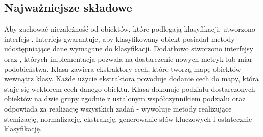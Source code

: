\documentclass{classrep}
\begin{document}
\subsection{Najważniejsze składowe}
Aby zachować niezależność od obiektów, które podlegają klasyfikacji, utworzono interfejs .
Interfejs gwarantuje, aby klasyfikowany obiekt posiadał metody udostępniające dane wymagane do klasyfikacji. Dodatkowo 
stworzono interfejsy  oraz , których implementacja pozwala na dostarczenie
nowych metryk lub miar podobieństwa. Klasa  zawiera ekstraktory cech, które tworzą mapę obiektów 
 wewnątrz klasy. Każde użycie ekstraktora powoduje dodanie cech do mapy, która staje się wektorem 
cech danego obiektu. Klasa  dokonuje podziału dostarczonych obiektów na dwie grupy zgodnie
z ustalonym współczynnikiem podziału oraz odpowiada za realizację wszystkich zadań - wywołuje metody realizujące
stemizację, normalizację, ekstrakcję, generowanie słów kluczowych i ostatecznie klasyfikację.
\end{document}
